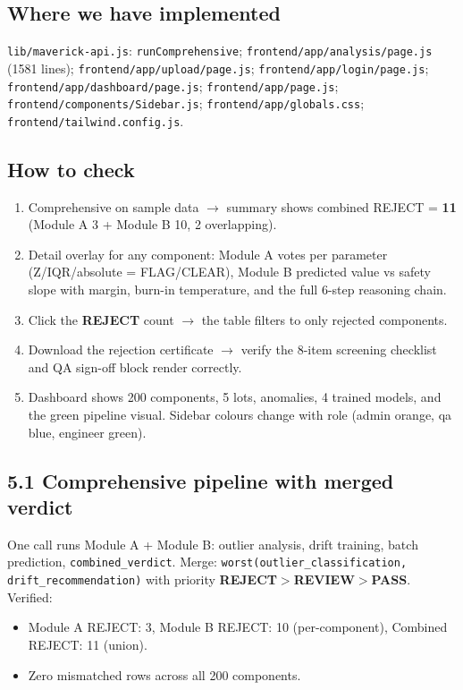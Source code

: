 \documentclass[11pt,a4paper]{article}
\newcommand{\code}[1]{\texttt{\small #1}}
\newcommand{\keys}[1]{\textbf{\sffamily#1}}
\begin{document}
\subsection*{Where we have implemented}
\code{lib/maverick-api.js}: \code{runComprehensive}; \code{frontend/app/analysis/page.js}
(1581 lines); \code{frontend/app/upload/page.js}; \code{frontend/app/login/page.js};
\code{frontend/app/dashboard/page.js}; \code{frontend/app/page.js}; \code{frontend/components/Sidebar.js};
\code{frontend/app/globals.css}; \code{frontend/tailwind.config.js}.

\subsection*{How to check}
\begin{enumerate}[leftmargin=1.5em]
  \item Comprehensive on sample data $\rightarrow$ summary shows combined REJECT = \textbf{11}
        (Module A 3 + Module B 10, 2 overlapping).
  \item Detail overlay for any component: Module A votes per parameter (Z/IQR/absolute =
        FLAG/CLEAR), Module B predicted value vs safety slope with margin, burn-in temperature,
        and the full 6-step reasoning chain.
  \item Click the \keys{REJECT} count $\rightarrow$ the table filters to only rejected components.
  \item Download the rejection certificate $\rightarrow$ verify the 8-item screening checklist
        and QA sign-off block render correctly.
  \item Dashboard shows 200 components, 5 lots, anomalies, 4 trained models, and the green
        pipeline visual. Sidebar colours change with role (admin orange, qa blue, engineer green).
\end{enumerate}

\subsection*{5.1 Comprehensive pipeline with merged verdict}
One call runs Module A + Module B: outlier analysis, drift training, batch prediction,
\code{combined\_verdict}. Merge: \code{worst(outlier\_classification, drift\_recommendation)}
with priority \keys{REJECT}$>$\keys{REVIEW}$>$\keys{PASS}. Verified:
\begin{itemize}[leftmargin=1.5em]
  \item Module A REJECT: 3, Module B REJECT: 10 (per-component), Combined REJECT: 11 (union).
  \item Zero mismatched rows across all 200 components.
\end{itemize}
\end{document}
